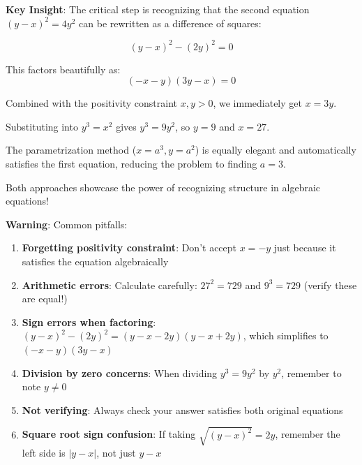 \documentclass[12pt]{article}
\begin{document}
\begin{keyinsightbox}
\textbf{Key Insight}: The critical step is recognizing that the second equation $(y-x)^2 = 4y^2$ can be rewritten as a difference of squares:

$$(y-x)^2 - (2y)^2 = 0$$

This factors beautifully as:
$$(-x-y)(3y-x) = 0$$

Combined with the positivity constraint $x, y > 0$, we immediately get $x = 3y$.

Substituting into $y^3 = x^2$ gives $y^3 = 9y^2$, so $y = 9$ and $x = 27$.

The parametrization method ($x = a^3, y = a^2$) is equally elegant and automatically satisfies the first equation, reducing the problem to finding $a = 3$.

Both approaches showcase the power of recognizing structure in algebraic equations!
\end{keyinsightbox}

\begin{warningbox}
\textbf{Warning}: Common pitfalls:
\begin{enumerate}
    \item \textbf{Forgetting positivity constraint}: Don't accept $x = -y$ just because it satisfies the equation algebraically
    \item \textbf{Arithmetic errors}: Calculate carefully: $27^2 = 729$ and $9^3 = 729$ (verify these are equal!)
    \item \textbf{Sign errors when factoring}: $(y-x)^2 - (2y)^2 = (y-x-2y)(y-x+2y)$, which simplifies to $(-x-y)(3y-x)$
    \item \textbf{Division by zero concerns}: When dividing $y^3 = 9y^2$ by $y^2$, remember to note $y \neq 0$
    \item \textbf{Not verifying}: Always check your answer satisfies both original equations
    \item \textbf{Square root sign confusion}: If taking $\sqrt{(y-x)^2} = 2y$, remember the left side is $|y-x|$, not just $y-x$
\end{enumerate}
\end{warningbox}
\end{document}
